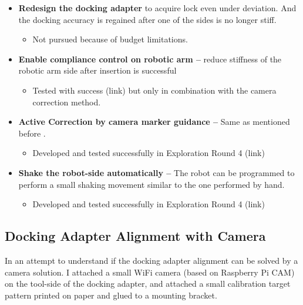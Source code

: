 \begin{itemize}
	\item \textbf{Redesign the docking adapter} to acquire lock even under deviation. And the docking accuracy is regained after one of the sides is no longer stiff.

\begin{itemize}
	\item Not pursued because of budget limitations.

\end{itemize}
	\item \textbf{Enable compliance control on robotic arm --} reduce stiffness of the robotic arm side after insertion is successful

\begin{itemize}
	\item Tested with success (link) but only in combination with the camera correction method.

\end{itemize}
	\item \textbf{Active Correction by camera marker guidance --} Same as mentioned before .

\begin{itemize}
	\item Developed and tested successfully in Exploration Round 4 (link)

\end{itemize}
	\item \textbf{Shake the robot-side automatically --} The robot can be programmed to perform a small shaking movement similar to the one performed by hand.

\begin{itemize}
	\item Developed and tested successfully in Exploration Round 4 (link)

\end{itemize}
\end{itemize}

\subsection{Docking Adapter Alignment with Camera}
\label{subsection:exploration-3-docking-adapter-alignment-with-camera}

In an attempt to understand if the docking adapter alignment can be solved by a camera solution. I attached a small WiFi camera (based on Raspberry Pi CAM) on the tool-side of the docking adapter, and attached a small calibration target pattern printed on paper and glued to a mounting bracket.

